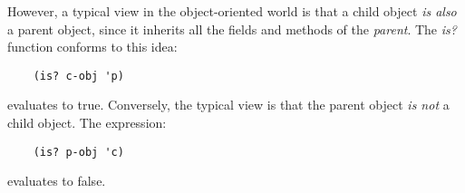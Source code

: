 However, a typical view in the object-oriented world is that a
child object {\it is also} a parent object,
since it inherits all the fields and
methods of the {\it parent}. The {\it is?} function conforms to this idea:

\begin{verbatim}
    (is? c-obj 'p)
\end{verbatim}

evaluates to true.
Conversely, the typical view is that the parent object {\it is not}
a child object. The expression:

\begin{verbatim}
    (is? p-obj 'c)
\end{verbatim}

evaluates to false.
